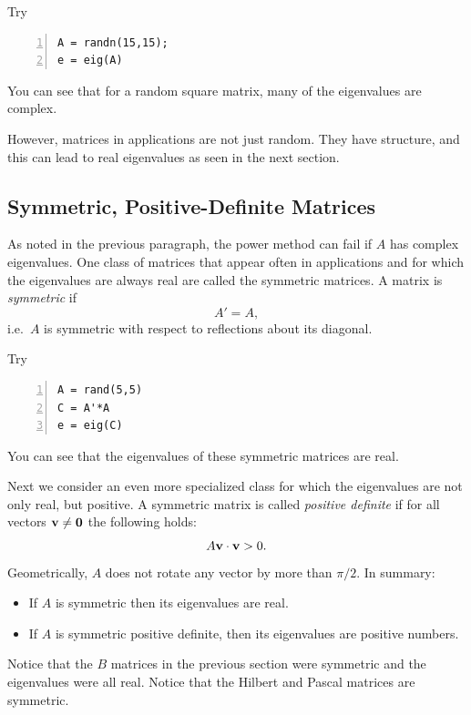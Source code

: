 Try
\begin{lstlisting}[frame=none,numbers=left]
A = randn(15,15);
e = eig(A)
\end{lstlisting}
You can see that for a random square matrix, many of the eigenvalues are complex.

However, matrices in applications are not just random. They have structure, 
and this can lead to real eigenvalues as seen in the next section.



\subsection*{Symmetric, Positive-Definite Matrices}

As noted in the previous paragraph, the power method can fail
if $A$ has complex eigenvalues. One class of matrices that appear often
in applications and for which the eigenvalues are always real are called
the symmetric matrices. A matrix is {\em symmetric} if
$$
     A' = A,
$$
i.e.~$A$ is symmetric with respect to reflections about its diagonal.


Try\begin{lstlisting}[frame=none,numbers=left]
A = rand(5,5)
C = A'*A
e = eig(C)
\end{lstlisting}
You can see that  the eigenvalues of these symmetric matrices are real.


Next we consider an even more specialized class for which the
eigenvalues are not only real, but positive. A symmetric matrix is
called {\em positive definite} if for all vectors $\mathbf{v} \neq
\mathbf{0}$ the following holds:
$$
     A \mathbf{v} \cdot \mathbf{v} > 0.
$$
Geometrically, $A$ does not rotate any vector by more than $\pi/2$.
In summary:
\begin{itemize}
\item If $A$ is symmetric then its eigenvalues are real.
\item If $A$ is symmetric positive definite, then its eigenvalues are positive numbers.
\end{itemize}

Notice that the $B$ matrices in the previous section were symmetric
and the eigenvalues were all real. Notice that the Hilbert and Pascal matrices
are symmetric.





